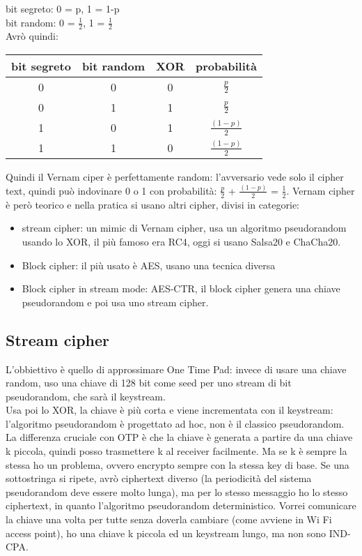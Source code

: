 \documentclass[16px]{article}
\begin{document}
bit segreto: 0 = p, 1 = 1-p\\ 
bit random: 0 = $\frac{1}{2}$, 1 = $\frac{1}{2}$\\
Avrò quindi: \\
\begin{table}
\begin{tabular}{||c c c c||}
\hline\hline
bit segreto & bit random & XOR & probabilità \\
\hline
0 & 0 & 0 & $\frac{p}{2}$\\
\hline
0 & 1 & 1 & $\frac{p}{2}$\\
\hline
1 & 0 & 1 & $\frac{(1-p)}{2}$\\
\hline
1 & 1 & 0 & $\frac{(1-p)}{2}$\\
\end{tabular}
\end{table}
Quindi il Vernam ciper è perfettamente random: l'avversario vede solo il cipher text, quindi può indovinare 0 o 1 con probabilità: $\frac{p}{2}$ + $\frac{(1-p)}{2}$ = $\frac{1}{2}$.
Vernam cipher è però teorico e nella pratica si usano altri cipher, divisi in categorie:
\begin{itemize}
\item stream cipher: un mimic di Vernam cipher, usa un algoritmo pseudorandom usando lo XOR, il più famoso era RC4, oggi si usano Salsa20 e ChaCha20.
\item Block cipher: il più usato è AES, usano una tecnica diversa
\item Block cipher in stream mode: AES-CTR, il block cipher genera una chiave pseudorandom e poi usa uno stream cipher.
\end{itemize}
\subsection{Stream cipher}
L'obbiettivo è quello di approssimare One Time Pad: invece di usare una chiave random, uso una chiave di 128 bit come seed per uno stream di bit pseudorandom, che sarà il keystream.\\ Usa poi lo XOR, la chiave è più corta e viene incrementata con il keystream: l'algoritmo pseudorandom è progettato ad hoc, non è il classico pseudorandom. La differenza cruciale con OTP è che la chiave è generata a partire da una chiave k piccola, quindi posso trasmettere k al receiver facilmente. Ma se k è sempre la stessa ho un problema, ovvero encrypto sempre con la stessa key di base. Se una sottostringa si ripete, avrò ciphertext diverso (la periodicità del sistema pseudorandom deve essere molto lunga), ma per lo stesso messaggio ho lo stesso ciphertext, in quanto l'algoritmo pseudorandom  deterministico. Vorrei comunicare la chiave una volta per tutte senza doverla cambiare (come avviene in Wi Fi access point), ho una chiave k piccola ed un keystream lungo, ma non sono IND-CPA.
\end{document}
